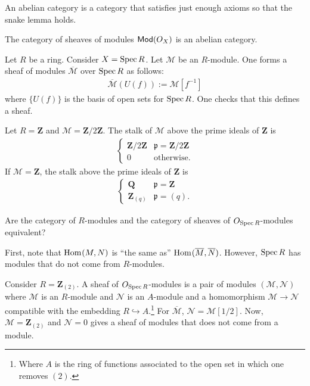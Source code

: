 \documentclass [11 pt, oneside] {article}
\begin{document}
\begin{remark}
	An abelian category is a category that satisfies just enough axioms so that the snake lemma holds.
\end{remark}

The category of sheaves of modules $\textsf{Mod}(\relax{O}_X)$ is an abelian category.

\begin{example}[ ]\label{}\text{}
Let $R$ be a ring. Consider $X=\operatorname{Spec} R$. Let $\mathscr{M}$ be an $R$-module. One forms a sheaf of modules $\overline{\mathscr{M}}$ over $\operatorname{Spec} R$ as follows:
\begin{align*}
	\overline{\mathscr{M}}(U(f)) := \mathscr{M}[f^{-1}]
\end{align*}
where $\{U(f)\}$ is the basis of open sets for $\operatorname{Spec} R$. One checks that this defines a sheaf.
\end{example}

\begin{example}[ ]\label{}\text{}
Let $R=\mathbf{Z}$ and $\mathscr{M}=\mathbf{Z}/2\mathbf{Z}$. The stalk of $\mathscr{M}$ above the prime ideals of $\mathbf{Z}$ is
\begin{align*}
	\begin{cases}
		\mathbf{Z}/2\mathbf{Z}& \mathfrak{p}=\mathbf{Z}/2\mathbf{Z}\\
		0&\textrm{otherwise.}
	\end{cases}
\end{align*}
If $\mathscr{M}=\mathbf{Z}$, the stalk above the prime ideals of $\mathbf{Z}$ is 
\begin{align*}
	\begin{cases}
		\mathbf{Q} & \mathfrak{p}=\mathbf{Z}\\
		\mathbf{Z}_{(q)}&  \mathfrak{p}= (q).
	\end{cases}
\end{align*}
\end{example}

\begin{problem}
	Are the category of $R$-modules and the category of sheaves of $\relax{O}_{\operatorname{Spec} R}$-modules equivalent?
\end{problem}

First, note that $\operatorname{Hom}_{}(\relax{M}, \relax{N})$ is ``the same as'' $\operatorname{Hom}_{}(\overline{\relax{M}}, \overline{\relax{N}})$. However, $\operatorname{Spec} R$ has modules that do not come from $R$-modules.

\begin{example}[ ]\label{}\text{}
Consider $R=\mathbf{Z}_{(2)}$. A sheaf of $\relax{O}_{\operatorname{Spec} R}$-modules is a pair of modules $(\mathscr{M},\mathscr{N})$ where $\mathscr{M}$ is an $R$-module and $\mathscr{N}$ is an $A$-module and a homomorphism $\mathscr{M}\longrightarrow \mathscr{N}$ compatible with the embedding $R \hookrightarrow A$.\footnote{Where $A$ is the ring of functions associated to the open set in which one removes $(2)$.} For $\overline{\mathscr{M}}$, $\mathscr{N} = \mathscr{M}[1/2]$. Now, $\mathscr{M}=\mathbf{Z}_{(2)}$ and $\mathscr{N}=0$ gives a sheaf of modules that does not come from a module.
\end{example}
\end{document}
